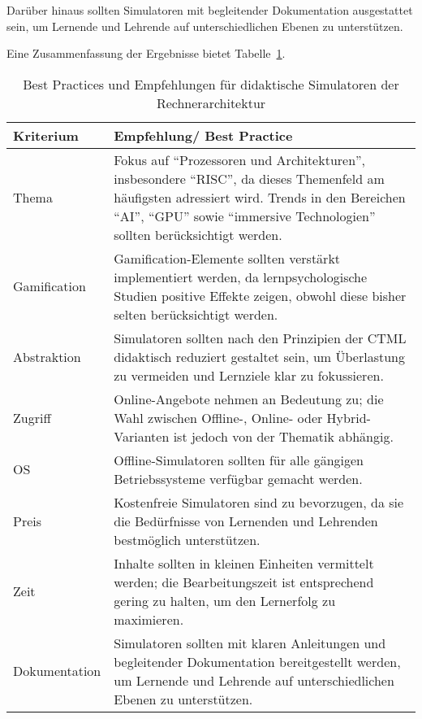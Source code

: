Darüber hinaus sollten Simulatoren mit begleitender Dokumentation ausgestattet sein, um Lernende und Lehrende auf unterschiedlichen Ebenen zu unterstützen.

Eine Zusammenfassung der Ergebnisse bietet Tabelle~\ref{tab:best_practices}.

\begin{table}[ht]
    \centering
    \caption{Best Practices und Empfehlungen für didaktische Simulatoren der Rechnerarchitektur}
    \label{tab:best_practices}
    \small
    \begin{tabularx}{\textwidth}{p{4cm}X}
        \toprule
        \textbf{Kriterium} & \textbf{Empfehlung/ Best Practice} \\
        \midrule

        Thema & Fokus auf \enquote{Prozessoren und Architekturen}, insbesondere \enquote{RISC}, da dieses Themenfeld am häufigsten adressiert wird. Trends in den Bereichen \enquote{AI}, \enquote{GPU} sowie \enquote{immersive Technologien} sollten berücksichtigt werden. \\

        Gamification & Gamification-Elemente sollten verstärkt implementiert werden, da lernpsychologische Studien positive Effekte zeigen, obwohl diese bisher selten berücksichtigt werden. \\

        Abstraktion & Simulatoren sollten nach den Prinzipien der \ac{CTML} didaktisch reduziert gestaltet sein, um Überlastung zu vermeiden und Lernziele klar zu fokussieren. \\

        Zugriff & Online-Angebote nehmen an Bedeutung zu; die Wahl zwischen Offline-, Online- oder Hybrid-Varianten ist jedoch von der Thematik abhängig. \\

        OS & Offline-Simulatoren sollten für alle gängigen Betriebssysteme verfügbar gemacht werden. \\

        Preis & Kostenfreie Simulatoren sind zu bevorzugen, da sie die Bedürfnisse von Lernenden und Lehrenden bestmöglich unterstützen. \\

        Zeit & Inhalte sollten in kleinen Einheiten vermittelt werden; die Bearbeitungszeit ist entsprechend gering zu halten, um den Lernerfolg zu maximieren. \\

        Dokumentation & Simulatoren sollten mit klaren Anleitungen und begleitender Dokumentation bereitgestellt werden, um Lernende und Lehrende auf unterschiedlichen Ebenen zu unterstützen. \\
        \bottomrule
    \end{tabularx}
\end{table}


